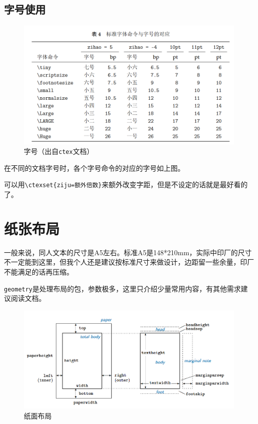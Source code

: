 \documentclass[10pt,openany]{book}
\begin{document}
\subsection{字号使用}

\begin{figure}[H]
    \centering
    \includegraphics[width=\linewidth]{data/fontsize.png}
    \caption{字号（出自\texttt{ctex}文档）}
\end{figure}

在不同的文档字号时，各个字号命令的对应的字号如上图。

可以用\texttt{\textbackslash{}ctexset\{ziju=额外倍数\}}来额外改变字距，但是不设定的话就是最好看的了。

\section{纸张布局}

一般来说，同人文本的尺寸是A5左右。标准A5是148*210mm，实际中印厂的尺寸不一定能到这里，但我个人还是建议按标准尺寸来做设计，边距留一些余量，印厂不能满足的话再压缩。

\texttt{geometry}是处理布局的包，参数极多，这里只介绍少量常用内容，有其他需求建议阅读文档。

\begin{figure}[H]
    \centering
    \includegraphics[width=.8\linewidth]{data/paper.png}
    \caption{纸面布局}
\end{figure}
\end{document}
